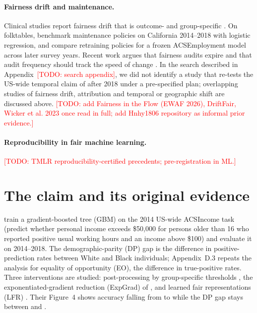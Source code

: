 \documentclass[10pt]{article}
\newcommand{\todo}[1]{\textcolor{red}{[TODO: #1]}}
\begin{document}
\paragraph{Fairness drift and maintenance.}
Clinical studies report fairness drift that is outcome- and group-specific \citep{davis2025emerging}.
On folktables, \citet{butnaru2026fairness} benchmark maintenance policies on California 2014--2018 with logistic regression, and \citet{ceross2026finite} compare retraining policies for a frozen ACSEmployment model across later survey years.
Recent work argues that fairness audits expire \citep{facchini2026auditing} and that audit frequency should track the speed of change \citep{liu2026fairness}.
In the search described in Appendix~\todo{search appendix}, we did not identify a study that re-tests the US-wide temporal claim of \citet{ding2021retiring} after 2018 under a pre-specified plan; overlapping studies of fairness drift, attribution and temporal or geographic shift are discussed above.
\todo{add Fairness in the Flow (EWAF 2026), DriftFair, Wicker et al. 2023 once read in full; add Hnhy1806 repository as informal prior evidence.}

\paragraph{Reproducibility in fair machine learning.}
\todo{TMLR reproducibility-certified precedents; pre-registration in ML.}

\section{The claim and its original evidence}
\label{sec:claim}

\citet[Section 4.1]{ding2021retiring} train a gradient-boosted tree (GBM) on the 2014 US-wide ACSIncome task (predict whether personal income exceeds \$50{,}000 for persons older than 16 who reported positive usual working hours and an income above \$100) and evaluate it on 2014--2018.
The demographic-parity (DP) gap is the difference in positive-prediction rates between White and Black individuals; Appendix~D.3 repeats the analysis for equality of opportunity (EO), the difference in true-positive rates.
Three interventions are studied: post-processing by group-specific thresholds \citep{hardt2016equality}, the exponentiated-gradient reduction (ExpGrad) of \citet{agarwal2018reductions}, and learned fair representations (LFR) \citep{zemel2013learning}.
Their Figure~4 shows accuracy falling from \PubAccFirst{} to \PubAccLast{} while the DP gap stays between \PubDPMin{} and \PubDPMax{}.
\end{document}
